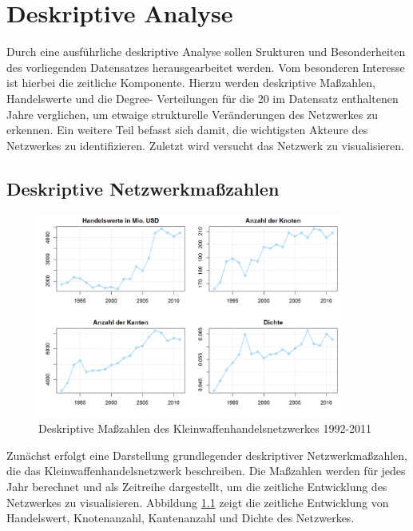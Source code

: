 \documentclass[a4paper,ngerman,oneside,titlepage,bibliography=totoc,11pt]{scrreprt}
\begin{document}
\chapter{Deskriptive Analyse}
Durch eine ausführliche deskriptive Analyse sollen Srukturen und Besonderheiten des vorliegenden Datensatzes herausgearbeitet werden. Vom besonderen Interesse ist hierbei die zeitliche Komponente. Hierzu werden deskriptive Maßzahlen, Handelswerte und die Degree- Verteilungen für die 20 im Datensatz enthaltenen Jahre verglichen, um etwaige strukturelle Veränderungen des Netzwerkes zu erkennen.
Ein weitere Teil befasst sich damit, die wichtigsten Akteure des Netzwerkes zu identifizieren. Zuletzt wird versucht das Netzwerk zu visualisieren.

\section{Deskriptive Netzwerkmaßzahlen}
\begin{figure}[ht]
	\centering
		\includegraphics[width=0.9\textwidth]{Grafiken/ts_descriptives.png}
	\caption{Deskriptive Maßzahlen des Kleinwaffenhandelsnetzwerkes 1992-2011}
	\label{fig:ts_descriptives}
\end{figure}
Zunächst erfolgt eine Darstellung grundlegender deskriptiver Netzwerkmaßzahlen, die das Kleinwaffenhandelsnetzwerk beschreiben. Die Maßzahlen werden für jedes Jahr berechnet und als Zeitreihe dargestellt, um die zeitliche Entwicklung des Netzwerkes zu visualisieren. Abbildung \ref{fig:ts_descriptives} zeigt die zeitliche Entwicklung  von Handelswert, Knotenanzahl, Kantenanzahl und Dichte des Netzwerkes.
\end{document}
